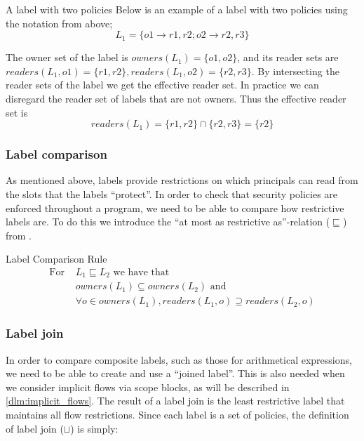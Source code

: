 \begin{example}{A label with two policies}\label{dlm:ex:simple_label}
  Below is an example of a label with two policies using the notation from above;
  $$L_1 = \{o1 \rightarrow r1, r2; o2 \rightarrow r2, r3\}$$

  The owner set of the label is $owners(L_1) = \{o1, o2\}$, and its reader sets are $readers(L_1, o1) = \{r1, r2\}, readers(L_1, o2) = \{r2, r3\}$.
  By intersecting the reader sets of the label we get the effective reader set.
  In practice we can disregard the reader set of labels that are not owners.
  Thus the effective reader set is
  $$readers(L_1) = \{r1,r2\} \cap \{r2, r3\} = \{r2\}$$
\end{example}

\subsubsection{Label comparison}
As mentioned above, labels provide restrictions on which principals can read from the slots that the labels ``protect''.
In order to check that security policies are enforced throughout a program, we need to be able to compare how restrictive labels are.
To do this we introduce the ``at most as restrictive as''-relation ($\sqsubseteq$) from \cite{myers1997}.


\begin{definition}{Label Comparison Rule}
  \begin{align}
    \text{For } & L_1 \sqsubseteq L_2 \text{ we have that} \nonumber \\
    & owners(L_1) \subseteq owners(L_2) \text{ and} \nonumber \\
    & \forall o \in owners(L_1), readers(L_1, o) \supseteq readers(L_2, o) \nonumber
  \end{align}
\end{definition}

\subsubsection{Label join}
In order to compare composite labels, such as those for arithmetical expressions, we need to be able to create and use a ``joined label''.
This is also needed when we consider implicit flows via scope blocks, as will be described in \cref{dlm:implicit_flows}.
The result of a label join is the least restrictive label that maintains all flow restrictions.
Since each label is a set of policies, the definition of label join ($\sqcup$) is simply:

